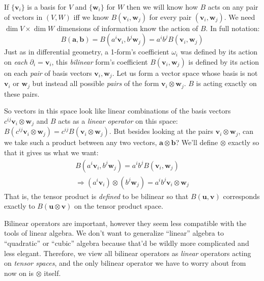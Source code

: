 \documentclass[../master.tex]{subfiles}
\begin{document}
	If $\{\mathbf v_i \}$ is a basis for $V$ and $\{\mathbf w_i \}$ for $W$ then we will know how $B$ acts on any pair of vectors in $(V, W)$ iff we know $B(\mathbf v_i, \mathbf w_j)$ for every pair $(\mathbf v_i, \mathbf w_j)$. We need $\dim V \times \dim W$ dimensions of information know the action of $B$.
	In full notation:
	\begin{equation}
		B(\mathbf a, \mathbf b) = B(a^i \mathbf v_i, b^j \mathbf w_j) = a^i b^j B(\mathbf v_i, \mathbf w_j)
	\end{equation}
	Just as in differential geometry, a 1-form's coefficient $\omega_i$ was defined by its action on \emph{each} $\partial_i = \mathbf v_i$, this \emph{bilinear} form's coefficient $B(\mathbf v_i, \mathbf w_j)$ is defined by its action on each \emph{pair} of basis vectors $\mathbf v_i, \mathbf w_j$. Let us form a vector space whose basis is not $\mathbf v_i$ or $\mathbf w_j$ but instead all possible \emph{pairs} of the form $\mathbf v_i \otimes \mathbf w_j$. $B$ is acting exactly on these pairs. 
	
	So vectors in this space look like linear combinations of the basis vectors $c^{ij} \mathbf v_i \otimes \mathbf w_j$ and $B$ acts as a \emph{linear operator} on this space: $B(c^{ij} \mathbf v_i \otimes \mathbf w_j) = c^{ij} B(\mathbf v_i \otimes \mathbf w_j)$. But besides looking at the pairs $\mathbf v_i \otimes \mathbf w_j$, can we take such a product between any two vectors, $\mathbf a \otimes \mathbf b$? We'll define $\otimes$ exactly so that it gives us what we want:
	\begin{align*}
		B(a^i \mathbf v_i, b^j \mathbf w_j) = a^i b^j B(\mathbf v_i, \mathbf w_j)\\ \Rightarrow (a^i \mathbf v_i) \otimes (b^j \mathbf w_j) = a^i b^j \mathbf v_i \otimes \mathbf w_j
	\end{align*}
	That is, the tensor product is \emph{defined} to be bilinear so that $B(\mathbf u, \mathbf v)$ corresponds exactly to $B(\mathbf u \otimes \mathbf v)$ on the tensor product space.
	
	
	
	Bilinear operators are important, however they seem less compatible with the tools of linear algebra. We don't want to generalize ``linear'' algebra to ``quadratic'' or ``cubic'' algebra because that'd be wildly more complicated and less elegant. Therefore, we view all bilinear operators as \emph{linear} operators acting on \emph{tensor spaces}, and the only bilinear operator we have to worry about from now on is $\otimes$ itself. 
\end{document}
